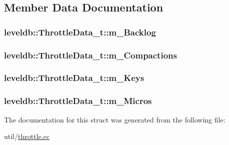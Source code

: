 \subsection{Member Data Documentation}
\hypertarget{structleveldb_1_1_throttle_data__t_a1cccb449d7d892dfa2cd50ad1718f1a4}{}
\subsubsection[{m\+\_\+\+Backlog}]{ leveldb\+::\+Throttle\+Data\+\_\+t\+::m\+\_\+\+Backlog}\label{structleveldb_1_1_throttle_data__t_a1cccb449d7d892dfa2cd50ad1718f1a4}
\hypertarget{structleveldb_1_1_throttle_data__t_a3e1f7052c63af728e7a2227965170218}{}
\subsubsection[{m\+\_\+\+Compactions}]{ leveldb\+::\+Throttle\+Data\+\_\+t\+::m\+\_\+\+Compactions}\label{structleveldb_1_1_throttle_data__t_a3e1f7052c63af728e7a2227965170218}
\hypertarget{structleveldb_1_1_throttle_data__t_a1e18042eb518407a28a142cd36680e79}{}
\subsubsection[{m\+\_\+\+Keys}]{ leveldb\+::\+Throttle\+Data\+\_\+t\+::m\+\_\+\+Keys}\label{structleveldb_1_1_throttle_data__t_a1e18042eb518407a28a142cd36680e79}
\hypertarget{structleveldb_1_1_throttle_data__t_ade5e9876a9b558bdf7b4bea98416afa4}{}
\subsubsection[{m\+\_\+\+Micros}]{ leveldb\+::\+Throttle\+Data\+\_\+t\+::m\+\_\+\+Micros}\label{structleveldb_1_1_throttle_data__t_ade5e9876a9b558bdf7b4bea98416afa4}


The documentation for this struct was generated from the following file\+:\begin{DoxyCompactItemize}
\item 
util/\hyperlink{throttle_8cc}{throttle.\+cc}\end{DoxyCompactItemize}
